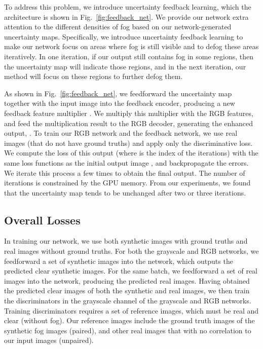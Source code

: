 \documentclass[runningheads]{llncs}
\begin{document}
To address this problem, we introduce uncertainty feedback learning, which the architecture is shown in Fig.~\ref{fig:feedback_net}.
We provide our network extra attention to the different densities of fog based on our network-generated uncertainty maps.
Specifically, we introduce uncertainty feedback learning to make our network focus on areas where fog is still visible and to defog these areas iteratively.
In one iteration, if our output still contains fog in some regions, then the uncertainty map will indicate those regions, and in the next iteration, our method will focus on these regions to further defog them.

As shown in Fig.~\ref{fig:feedback_net}, we feedforward the uncertainty map together with the input image into the feedback encoder, producing a new feedback feature multiplier . 
We multiply this multiplier with the RGB features, and feed the multiplication result to the RGB decoder, generating the enhanced output, .
To train our RGB network and the feedback network, we use real images (that do not have ground truths) and apply only the discriminative loss.
We compute the loss of this output  (where  is the index of the iterations) with the same loss functions as the initial output image , and backpropagate the errors.
We iterate this process a few times to obtain the final output. 
The number of iterations is constrained by the GPU memory. From our experiments, we found that the uncertainty map tends to be unchanged after two or three iterations.


\subsection{Overall Losses}
In training our network, we use both synthetic images with ground truths and real images without ground truths. 
For both the grayscale and RGB networks, we feedforward a set of synthetic images into the network, which outputs the predicted clear synthetic images.
For the same batch, we feedforward a set of real images into the network, producing the predicted real images.
Having obtained the predicted clear images of both the synthetic and real images, we then train the discriminators in the grayscale channel of the grayscale and RGB networks.
Training discriminators requires a set of reference images, which must be real and clear (without fog).
Our reference images include the ground truth images of the synthetic fog images (paired), and other real images that with no correlation to our input images (unpaired).
\end{document}
